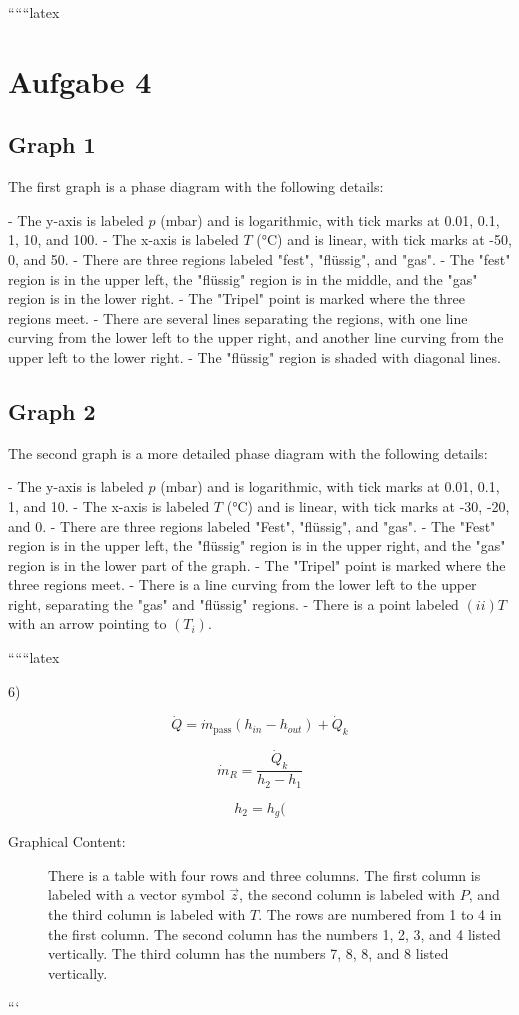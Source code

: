 
``````latex


\section*{Aufgabe 4}

\subsection*{Graph 1}

The first graph is a phase diagram with the following details:

- The y-axis is labeled \( p \) (mbar) and is logarithmic, with tick marks at 0.01, 0.1, 1, 10, and 100.
- The x-axis is labeled \( T \) (°C) and is linear, with tick marks at -50, 0, and 50.
- There are three regions labeled "fest", "flüssig", and "gas".
- The "fest" region is in the upper left, the "flüssig" region is in the middle, and the "gas" region is in the lower right.
- The "Tripel" point is marked where the three regions meet.
- There are several lines separating the regions, with one line curving from the lower left to the upper right, and another line curving from the upper left to the lower right.
- The "flüssig" region is shaded with diagonal lines.

\subsection*{Graph 2}

The second graph is a more detailed phase diagram with the following details:

- The y-axis is labeled \( p \) (mbar) and is logarithmic, with tick marks at 0.01, 0.1, 1, and 10.
- The x-axis is labeled \( T \) (°C) and is linear, with tick marks at -30, -20, and 0.
- There are three regions labeled "Fest", "flüssig", and "gas".
- The "Fest" region is in the upper left, the "flüssig" region is in the upper right, and the "gas" region is in the lower part of the graph.
- The "Tripel" point is marked where the three regions meet.
- There is a line curving from the lower left to the upper right, separating the "gas" and "flüssig" regions.
- There is a point labeled \((ii) T\) with an arrow pointing to \((T_i)\).

``````latex


6)

\[
\dot{Q} = \dot{m}_{\text{pass}} (h_{in} - h_{out}) + \dot{Q}_k
\]

\[
\dot{m}_R = \frac{\dot{Q}_k}{h_2 - h_1}
\]

\[
h_2 = h_g (
\]

\begin{description}
    \item[Graphical Content:] 
    There is a table with four rows and three columns. The first column is labeled with a vector symbol $\vec{z}$, the second column is labeled with $P$, and the third column is labeled with $T$. The rows are numbered from 1 to 4 in the first column. The second column has the numbers 1, 2, 3, and 4 listed vertically. The third column has the numbers 7, 8, 8, and 8 listed vertically.
\end{description}

```
